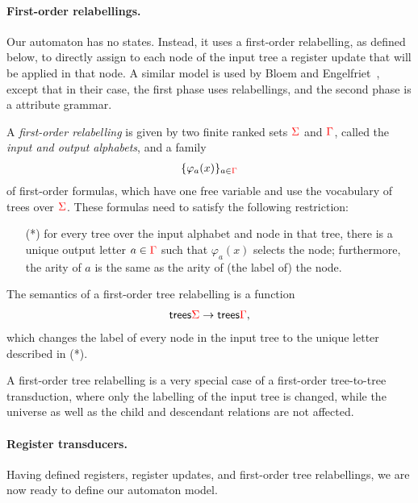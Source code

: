 \paragraph*{First-order relabellings.} Our automaton has no states. Instead, it uses a first-order relabelling, as defined below, to  directly assign to each node of the input tree a register update that will be applied in that node. A similar model is used by    Bloem and Engelfriet~\cite[Theorem 17]{bloem_comparison_2000}, except that in their case, the first phase uses  \mso relabellings, and the second phase is   a attribute grammar. 


\begin{definition} \label{def:forat}  A \emph{first-order relabelling} is given by two finite ranked sets ${\color{red}{\Sigma}}$ and ${\color{red}{\Gamma}}$, called the \emph{input and output alphabets}, and a family 
    \begin{align*}
    \{\varphi_a(x)\}_{a \in {\color{red}{\Gamma}}}
    \end{align*}
    of first-order formulas, which have one free variable and use the vocabulary of trees over  ${\color{red}{\Sigma}}$. These formulas need to satisfy the following restriction:
    \begin{enumerate}
        \item[(*)] for every tree over the input alphabet and node in that tree, there is a unique output letter $a \in {\color{red}{\Gamma}}$ such that $\varphi_a(x)$ selects the node; furthermore, the arity of $a$ is the same as the arity of (the label of) the  node. 
    \end{enumerate}
The semantics of a  first-order tree relabelling is a function 
\begin{align*}
\mathsf {trees} {\color{red}{\Sigma}} \to \mathsf {trees} {\color{red}{\Gamma}},
\end{align*}
which changes the label of every node in the input tree to the unique letter described in  (*). 
      \end{definition}


A first-order tree relabelling is a very special case of a first-order tree-to-tree transduction, where only the labelling of the input tree is changed, while the universe as well as the child and descendant relations are not affected. 

\paragraph*{Register transducers.} Having defined registers, register updates, and first-order tree relabellings, we are now ready to define our automaton model.


